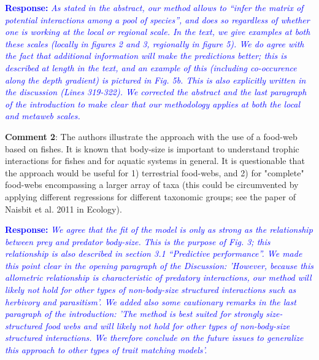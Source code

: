 \documentclass [12pt,onecolumn,twoside,openright]{report}
\begin{document}
\begin{onehalfspacing}
\medskip \textcolor{blue}{\textbf{Response:}} \textit{\textcolor{blue}{As stated
in the abstract, our method allows to ``infer the matrix of potential
interactions among a pool of species'', and does so regardless of whether one is
working at the local or regional scale. In the text, we give examples at both
these scales (locally in figures 2 and 3, regionally in figure 5). We do agree
with the fact that additional information will make the predictions better; this
is described at length in the text, and an example of this (including
co-occurence along the depth gradient) is pictured in Fig. 5b. This is also
explicitly written in the discussion (Lines  319-322). We corrected the abstract and the last paragraph of the introduction to make clear that our methodology applies at both the local and metaweb scales.}}

\medskip \textbf{Comment 2}: The authors illustrate the
approach with the use of a food-web based on fishes. It is known that body-size
is important to understand trophic interactions for fishes and for aquatic
systems in general. It is questionable that the approach would be useful for 1)
terrestrial food-webs, and 2) for "complete" food-webs encompassing a larger
array of taxa (this could be circumvented by applying different regressions for
different taxonomic groups; see the paper of Naisbit et al. 2011 in Ecology).

\medskip \textcolor{blue}{\textbf{Response:}} \textit{\textcolor{blue}{We agree
that the fit of the model is only as strong as the relationship between prey and
predator body-size. This is the purpose of Fig. 3; this relationship is also
described in section 3.1 ``Predictive performance''. We made this point clear in the opening paragraph of the Discussion: 'However, because this allometric relationship is characteristic of predatory interactions, our method will likely not hold for other types of non-body-size structured interactions such as herbivory and parasitism'. We added also some cautionary remarks in the last paragraph of the introduction: 'The method is best suited for strongly size-structured food webs and will likely not hold for other types of non-body-size structured interactions. We therefore conclude on the future issues to generalize this approach to other types of trait matching models'.}}


\end{onehalfspacing}
\end{document}
